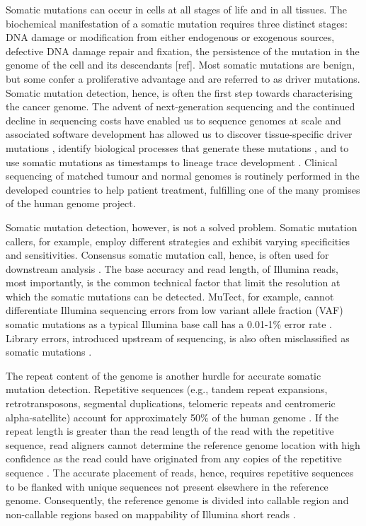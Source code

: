 Somatic mutations can occur in cells at all stages of life and in all tissues. The biochemical manifestation of a somatic mutation requires three distinct stages: DNA damage or modification from either endogenous or exogenous sources, defective DNA damage repair and fixation, the persistence of the mutation in the genome of the cell and its descendants [ref]. Most somatic mutations are benign, but some confer a proliferative advantage and are referred to as driver mutations. Somatic mutation detection, hence, is often the first step towards characterising the cancer genome. The advent of next-generation sequencing and the continued decline in sequencing costs have enabled us to sequence genomes at scale and associated software development has allowed us to discover tissue-specific driver mutations \cite{Martinez-Jimenez2020-kn}, identify biological processes that generate these mutations \cite{Alexandrov2013-kg}, and to use somatic mutations as timestamps to lineage trace development \cite{Behjati2014-gb}. Clinical sequencing of matched tumour and normal genomes is routinely performed in the developed countries to help patient treatment, fulfilling one of the many promises of the human genome project. 

Somatic mutation detection, however, is not a solved problem. Somatic mutation callers, for example, employ different strategies and exhibit varying specificities and sensitivities. Consensus somatic mutation call, hence, is often used for downstream analysis \cite{Bailey2020-ou}. The base accuracy and read length, of Illumina reads, most importantly, is the common technical factor that limit the resolution at which the somatic mutations can be detected. MuTect, for example, cannot differentiate Illumina sequencing errors from low variant allele fraction (VAF) somatic mutations as a typical Illumina base call has a 0.01-1\% error rate \cite{Cibulskis2013-gw}. Library errors, introduced upstream of sequencing, is also often misclassified as somatic mutations \cite{Costello2013-cz, Chen2017-ba, Abascal2021-pk} . 

The repeat content of the genome is another hurdle for accurate somatic mutation detection. Repetitive sequences (e.g., tandem repeat expansions, retrotransposons, segmental duplications, telomeric repeats and centromeric alpha-satellite) account for approximately 50\% of the human genome \cite{}. If the repeat length is greater than the read length of the read with the repetitive sequence, read aligners cannot determine the reference genome location with high confidence as the read could have originated from any copies of the repetitive sequence \cite{Li2008-dt}. The accurate placement of reads, hence, requires repetitive sequences to be flanked with unique sequences not present elsewhere in the reference genome. Consequently, the reference genome is divided into callable region and non-callable regions based on mappability of Illumina short reads \cite{1000_Genomes_Project_Consortium2012-rj}. 

